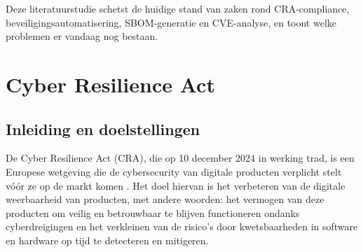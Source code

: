 Deze literatuurstudie schetst de huidige stand van zaken rond CRA-compliance, beveiligingsautomatisering, SBOM-generatie en CVE-analyse, en toont welke problemen er vandaag nog bestaan.

\section{Cyber Resilience Act}
\subsection{Inleiding en doelstellingen}
De Cyber Resilience Act (CRA), die op 10 december 2024 in werking trad, is een Europese wetgeving die de cybersecurity van digitale producten verplicht stelt vóór ze op de markt komen \autocite{EU_CRA}. Het doel hiervan is het verbeteren van de digitale weerbaarheid van producten, met andere woorden: het vermogen van deze producten om veilig en betrouwbaar te blijven functioneren ondanks cyberdreigingen en het verkleinen van de risico's door kwetsbaarheden in software en hardware op tijd te detecteren en mitigeren. 

